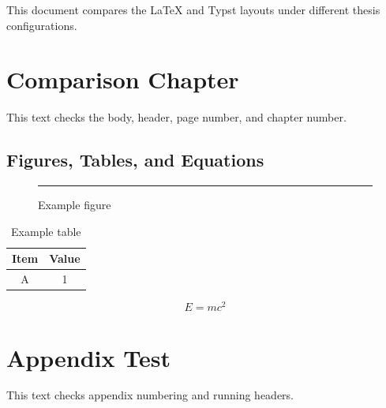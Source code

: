 \documentclass{thuthesis}
\newcommand\CompareChapterTitle{Comparison Chapter}
\newcommand\CompareBody{This text checks the body, header, page number, and chapter number.}
\newcommand\CompareSectionTitle{Figures, Tables, and Equations}
\newcommand\CompareFigureCaption{Example figure}
\newcommand\CompareTableCaption{Example table}
\newcommand\CompareAppendixTitle{Appendix Test}
\newcommand\CompareAppendixBody{This text checks appendix numbering and running headers.}
\newcommand\CompareChapterTitle{比较章节}
\newcommand\CompareBody{这是用于检查正文、页眉、页码和章节编号的示例文字。}
\newcommand\CompareSectionTitle{图表与公式}
\newcommand\CompareFigureCaption{示例图}
\newcommand\CompareTableCaption{示例表}
\newcommand\CompareAppendixTitle{附录测试}
\newcommand\CompareAppendixBody{这是用于检查附录编号和页眉的示例文字。}
\begin{document}
\maketitle

\frontmatter

\begin{abstract}
  本文用于比较 LaTeX 与 Typst 模板在不同论文配置下的版式。
\end{abstract}

\begin{abstract*}
  This document compares the LaTeX and Typst layouts under different
  thesis configurations.
\end{abstract*}

\tableofcontents

\mainmatter

\chapter{\CompareChapterTitle}

\CompareBody

\section{\CompareSectionTitle}

\begin{figure}[htb]
  \centering
  \rule{3cm}{1cm}
  \caption{\CompareFigureCaption}
\end{figure}

\begin{table}[htb]
  \centering
  \caption{\CompareTableCaption}
  \begin{tabular}{cc}
    \toprule
    Item & Value \\
    \midrule
    A & 1 \\
    \bottomrule
  \end{tabular}
\end{table}

\begin{equation}
  E = mc^2
\end{equation}

\appendix

\chapter{\CompareAppendixTitle}

\CompareAppendixBody
\end{document}
